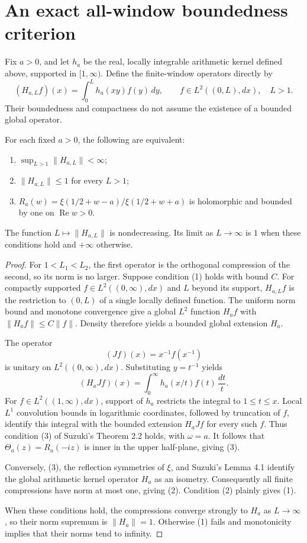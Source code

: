 \section{An exact all-window boundedness criterion}
Fix $a>0$, and let $h_a$ be the real, locally integrable arithmetic kernel
defined above, supported in $[1,\infty)$.  Define the finite-window operators
directly by
\[
 (H_{a,L}f)(x)=\int_0^L h_a(xy)f(y)\,dy,
 \qquad f\in L^2((0,L),dx),\quad L>1.
\]
Their boundedness and compactness do not assume the existence of a bounded
global operator.

\begin{theorem}
For each fixed $a>0$, the following are equivalent:
\begin{enumerate}
\item $\sup_{L>1}\|H_{a,L}\|<\infty$;
\item $\|H_{a,L}\|\leq1$ for every $L>1$;
\item $R_a(w)=\xi(1/2+w-a)/\xi(1/2+w+a)$ is holomorphic and bounded by one
      on $\operatorname{Re}w>0$.
\end{enumerate}
The function $L\mapsto\|H_{a,L}\|$ is nondecreasing.  Its limit as
$L\to\infty$ is $1$ when these conditions hold and $+\infty$ otherwise.
\end{theorem}

\begin{proof}
For $1<L_1<L_2$, the first operator is the orthogonal compression of the
second, so its norm is no larger.  Suppose condition (1) holds with bound
$C$.  For compactly supported $f\in L^2((0,\infty),dx)$ and $L$ beyond
its support, $H_{a,L}f$ is the restriction to $(0,L)$ of a single locally
defined function.  The uniform norm bound and monotone convergence give
a global $L^2$ function $H_af$ with $\|H_af\|\leq C\|f\|$.  Density
therefore yields a bounded global extension $H_a$.

The operator
\[
 (Jf)(x)=x^{-1}f(x^{-1})
\]
is unitary on $L^2((0,\infty),dx)$.  Substituting $y=t^{-1}$ yields
\[
 (H_aJf)(x)=\int_0^\infty h_a(x/t)f(t)\,\frac{dt}{t}.
\]
For $f\in L^2((1,\infty),dx)$, support of $h_a$ restricts the integral
to $1\leq t\leq x$.  Local $L^1$ convolution bounds in logarithmic
coordinates, followed by truncation of $f$, identify this integral with
the bounded extension $H_aJf$ for every such $f$.  Thus condition (3) of
Suzuki's Theorem 2.2 \cite{Suzuki2016} holds, with $\omega=a$.  It follows
that $\Theta_a(z)=R_a(-iz)$ is inner in the upper half-plane, giving (3).

Conversely, (3), the reflection symmetries of $\xi$, and Suzuki's
Lemma 4.1 identify the global arithmetic kernel operator $H_a$ as an
isometry.  Consequently all finite compressions have norm at most one,
giving (2).  Condition (2) plainly gives (1).

When these conditions hold, the compressions converge strongly to $H_a$
as $L\to\infty$, so their norm supremum is $\|H_a\|=1$.  Otherwise (1)
fails and monotonicity implies that their norms tend to infinity.
\end{proof}

